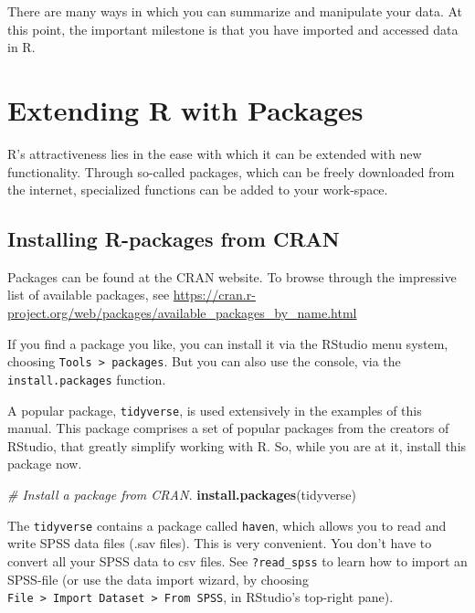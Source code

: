 \documentclass[]{book}
\newenvironment{Shaded}{\begin{snugshade}}{\end{snugshade}}
\newcommand{\KeywordTok}[1]{\textcolor[rgb]{0.13,0.29,0.53}{\textbf{#1}}}
\newcommand{\CommentTok}[1]{\textcolor[rgb]{0.56,0.35,0.01}{\textit{#1}}}
\newcommand{\NormalTok}[1]{#1}
\begin{document}
There are many ways in which you can summarize and manipulate your data.
At this point, the important milestone is that you have imported and
accessed data in R.

\section{Extending R with Packages}\label{extending-r-with-packages}


R's attractiveness lies in the ease with which it can be extended with
new functionality. Through so-called packages, which can be freely
downloaded from the internet, specialized functions can be added to your
work-space.

\subsection{Installing R-packages from
CRAN}\label{installing-r-packages-from-cran}

 

Packages can be found at the CRAN website. To browse through the
impressive list of available packages, see
\url{https://cran.r-project.org/web/packages/available_packages_by_name.html}

If you find a package you like, you can install it via the RStudio menu
system, choosing \texttt{Tools\ \textgreater{}\ packages}. But you can
also use the console, via the \texttt{install.packages} function.

A popular package, \texttt{tidyverse}, is used extensively in the
examples of this manual. This package comprises a set of popular
packages from the creators of RStudio, that greatly simplify working
with R. So, while you are at it, install this package now.

\begin{Shaded}
\begin{Highlighting}[]
\CommentTok{# Install a package from CRAN.}
\KeywordTok{install.packages}\NormalTok{(tidyverse)}
\end{Highlighting}
\end{Shaded}

The \texttt{tidyverse} contains a package called \texttt{haven}, which
allows you to read and write SPSS data files (.sav files). This is very
convenient. You don't have to convert all your SPSS data to csv files.
See \texttt{?read\_spss} to learn how to import an SPSS-file (or use the
data import wizard, by choosing
\texttt{File\ \textgreater{}\ Import\ Dataset\ \textgreater{}\ From\ SPSS},
in RStudio's top-right pane).
\end{document}
